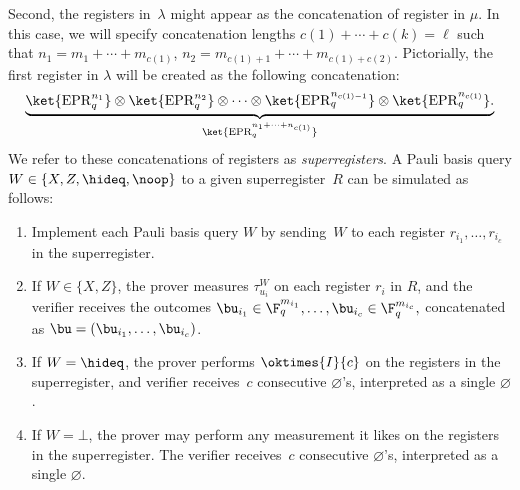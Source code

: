 \begin{notation}
Second, the registers in~$\lambda$ might appear as the concatenation of register in $\mu$.
In this case, we will specify concatenation lengths $c(1) + \cdots + c(k) = \ell$ such that
$n_1 = m_1 + \cdots + m_{c(1)}$, $n_2 = m_{c(1) + 1} + \cdots + m_{c(1) + c(2)}$.
Pictorially, the first register in $\lambda$ will be created as the following concatenation:
\begin{equation*}
\underbrace{
\ket{\mathrm{EPR}_q^{n_1}} \otimes \ket{\mathrm{EPR}_q^{n_2}} \otimes \cdots
\otimes \ket{\mathrm{EPR}_q^{n_{c(1)-1}}} \otimes \ket{\mathrm{EPR}_q^{n_{c(1)}}}. 
}_{\ket{\mathrm{EPR}_q^{n_1 + \cdots + n_{c(1)}}}}
\end{equation*}
We refer to these concatenations of registers as \emph{superregisters}.
A Pauli basis query $W \in \{X, Z, \hideq, \noop\}$ to a given superregister~$R$ can be simulated as follows:
\begin{enumerate}
\item  Implement each Pauli basis query $W$ by sending~$W$ to
  each register $r_{i_1}, \ldots, r_{i_{c}}$ in the superregister.
\item If $W \in \{X, Z\}$, the prover measures $\tau^W_{u_i}$ on each
  register $r_i$ in $R$, and the verifier receives the outcomes
$
\bu_{i_1} \in \F_q^{m_{i_1}}, \ldots, \bu_{i_{c}} \in \F_q^{m_{i_{c}}},
$
concatenated as $\bu = (\bu_{i_1}, \ldots, \bu_{i_c})$.
\item If $W = \hideq $, the prover performs $\oktimes{I}{c}$ on
  the registers in the superregister, and verifier receives~$c$ consecutive $\varnothing$'s, interpreted as a single $\varnothing$.
\item If $W = \bot$, the prover may perform any measurement it likes
  on the registers in the superregister.
  The verifier receives~$c$ consecutive $\varnothing$'s, interpreted as a single $\varnothing$.
\end{enumerate}
\end{notation}

